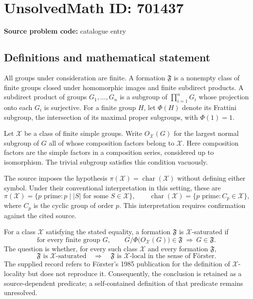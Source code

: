 \documentclass[11pt]{article}
\begin{document}
\section*{UnsolvedMath ID: 701437}
\textbf{Source problem code:} catalogue entry
\subsection{Definitions and mathematical statement}
All groups under consideration are finite. A formation \(\mathfrak F\) is a nonempty class of finite groups closed under homomorphic images and finite subdirect products. A subdirect product of groups \(G_1,\ldots,G_n\) is a subgroup of \(\prod_{i=1}^n G_i\) whose projection onto each \(G_i\) is surjective. For a finite group \(H\), let \(\Phi(H)\) denote its Frattini subgroup, the intersection of its maximal proper subgroups, with \(\Phi(1)=1\).

Let \(\mathcal X\) be a class of finite simple groups. Write \(O_{\mathcal X}(G)\) for the largest normal subgroup of \(G\) all of whose composition factors belong to \(\mathcal X\). Here composition factors are the simple factors in a composition series, considered up to isomorphism. The trivial subgroup satisfies this condition vacuously.

The source imposes the hypothesis \(\pi(\mathcal X)=\operatorname{char}(\mathcal X)\) without defining either symbol. Under their conventional interpretation in this setting, these are
\[
\pi(\mathcal X)=\{p\text{ prime}:p\mid |S|\text{ for some }S\in\mathcal X\},\qquad
\operatorname{char}(\mathcal X)=\{p\text{ prime}:C_p\in\mathcal X\},
\]
where \(C_p\) is the cyclic group of order \(p\). This interpretation requires confirmation against the cited source.

For a class \(\mathcal X\) satisfying the stated equality, a formation \(\mathfrak F\) is \(\mathcal X\)-saturated if
\[
\text{for every finite group }G,\qquad
G/\Phi\bigl(O_{\mathcal X}(G)\bigr)\in\mathfrak F
\ \Longrightarrow\ G\in\mathfrak F.
\]
The question is whether, for every such class \(\mathcal X\) and every formation \(\mathfrak F\),
\[
\mathfrak F\text{ is }\mathcal X\text{-saturated}
\quad\Longrightarrow\quad
\mathfrak F\text{ is }\mathcal X\text{-local in the sense of F\"orster}.
\]
The supplied record refers to F\"orster's 1985 publication for the definition of \(\mathcal X\)-locality but does not reproduce it. Consequently, the conclusion is retained as a source-dependent predicate; a self-contained definition of that predicate remains unresolved.
\end{document}
